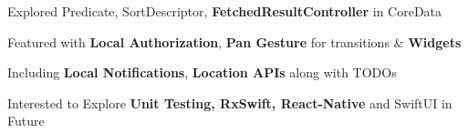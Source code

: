 \documentclass[]{Kauts}
\begin{document}
\begin{minipage}[t]{0.69\textwidth}
\begin{tightemize}
\item Explored Predicate, SortDescriptor, \textbf{FetchedResultController} in CoreData\\
\item Featured with \textbf{Local Authorization}, \textbf{Pan Gesture} for transitions \& \textbf{Widgets}\\
\item Including \textbf{Local Notifications}, \textbf{Location APIs} along with TODOs\\
\end{tightemize}
\sectionsep

Interested to Explore \textbf{Unit Testing, RxSwift, React-Native} and SwiftUI in Future
\end{minipage}

%
%
\end{document}
